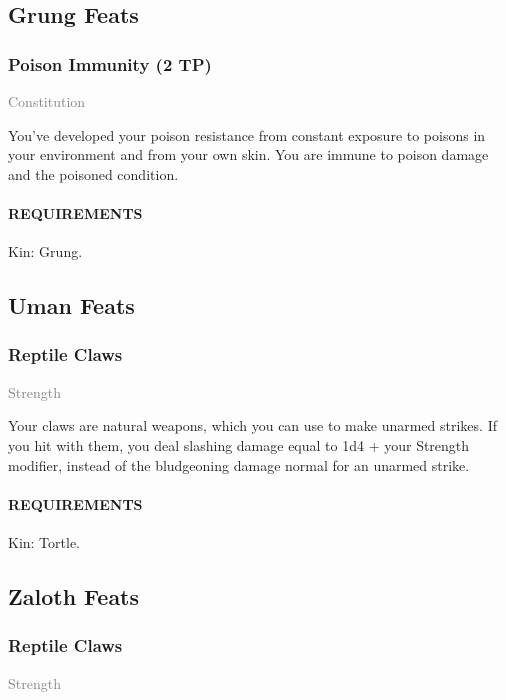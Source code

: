 \subsection*{Grung Feats}
    \subsubsection{Poison Immunity (2 TP)} \label{feat::poisonimmunity}
    \small{\textcolor{gray}{Constitution}}

    \normalsize
    You've developed your poison resistance from constant exposure to poisons in your environment and from your own skin.
    You are immune to poison damage and the poisoned condition.
    \paragraph{REQUIREMENTS} Kin: Grung.

\subsection*{Uman Feats}
    \subsubsection{Reptile Claws} \label{feat::reptileclaws}
    \small{\textcolor{gray}{Strength}}

    \normalsize
    Your claws are natural weapons, which you can use to make unarmed strikes.
    If you hit with them, you deal slashing damage equal to 1d4 + your Strength modifier, instead of the bludgeoning damage normal for an unarmed strike.
    \paragraph{REQUIREMENTS} Kin: Tortle.

\subsection*{Zaloth Feats}
    \subsubsection{Reptile Claws} \label{feat::reptileclaws}
    \small{\textcolor{gray}{Strength}}

